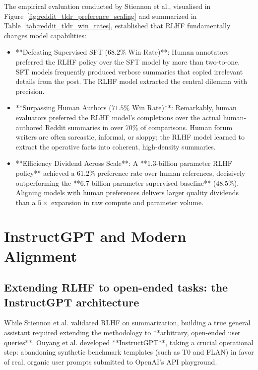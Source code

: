 \documentclass[../../main.tex]{subfiles}
\begin{document}
The empirical evaluation conducted by Stiennon et al., visualised in Figure~\ref{fig:reddit_tldr_preference_scaling} and summarized in Table~\ref{tab:reddit_tldr_win_rates}, established that RLHF fundamentally changes model capabilities:
\begin{itemize}
    \item **Defeating Supervised SFT ($68.2\%$ Win Rate)**: Human annotators preferred the RLHF policy over the SFT model by more than two-to-one. SFT models frequently produced verbose summaries that copied irrelevant details from the post. The RLHF model extracted the central dilemma with precision.
    \item **Surpassing Human Authors ($71.5\%$ Win Rate)**: Remarkably, human evaluators preferred the RLHF model's completions over the actual human-authored Reddit summaries in over $70\%$ of comparisons. Human forum writers are often sarcastic, informal, or sloppy; the RLHF model learned to extract the operative facts into coherent, high-density summaries.
    \item **Efficiency Dividend Across Scale**: A **1.3-billion parameter RLHF policy** achieved a $61.2\%$ preference rate over human references, decisively outperforming the **6.7-billion parameter supervised baseline** ($48.5\%$). Aligning models with human preferences delivers larger quality dividends than a $5\times$ expansion in raw compute and parameter volume.
\end{itemize}

\section{InstructGPT and Modern Alignment}
\label{sec:instructgpt_modern_paradigm}

\subsection{Extending RLHF to open-ended tasks: the InstructGPT architecture}
\label{subsec:instructgpt_architecture_pipeline}

While Stiennon et al. validated RLHF on summarization, building a true general assistant required extending the methodology to **arbitrary, open-ended user queries**. Ouyang et al. \citep{ouyang2022} developed **InstructGPT**, taking a crucial operational step: abandoning synthetic benchmark templates (such as T0 and FLAN) in favor of real, organic user prompts submitted to OpenAI's API playground.
\end{document}
